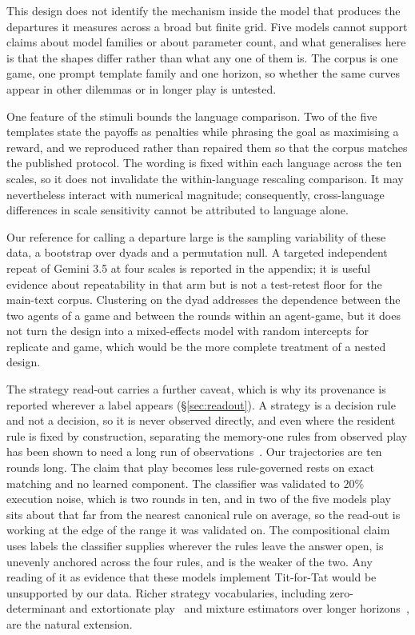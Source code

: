 \documentclass[openacc]{rsproca_new}
\begin{document}
This design does not identify the mechanism inside the model that produces the
departures it measures across a broad but finite grid. Five models cannot
support claims about model families or about parameter count, and what
generalises here is that the shapes differ rather than what any one of them is.
The corpus is one game, one prompt template family and one horizon, so whether
the same curves appear in other dilemmas or in longer play is untested.

One feature of the stimuli bounds the language comparison. Two of the five
templates state the payoffs as penalties while phrasing the goal as maximising
a reward, and we reproduced rather than repaired them so that the corpus
matches the published protocol. The wording is fixed within each language
across the ten scales, so it does not invalidate the within-language rescaling
comparison. It may nevertheless interact with numerical magnitude; consequently,
cross-language differences in scale sensitivity cannot be attributed to language
alone.

Our reference for calling a departure large is the sampling variability of
these data, a bootstrap over dyads and a permutation null. A targeted
independent repeat of Gemini 3.5 at four scales is reported in the appendix;
it is useful evidence about repeatability in that arm but is not a test-retest
floor for the main-text corpus.
Clustering on the dyad addresses the dependence between the two agents of a
game and between the rounds within an agent-game, but it does not turn the
design into a mixed-effects model with random intercepts for replicate and
game, which would be the more complete treatment of a nested design.

The strategy read-out carries a further caveat, which is why its provenance is
reported wherever a label appears (\S\ref{sec:readout}). A strategy is a
decision rule and not a decision, so it is never observed directly, and even
where the resident rule is fixed by construction, separating the memory-one
rules from observed play has been shown to need a long run of
observations~\cite{kim2021win}. Our trajectories are ten rounds long. The claim
that play becomes less rule-governed rests on exact matching and no learned
component. The classifier was validated to $20\%$ execution noise, which is two
rounds in ten, and in two of the five models play sits about that far from the
nearest canonical rule on average, so the read-out is working at the edge of
the range it was validated on. The compositional claim uses labels the
classifier supplies wherever the rules leave the answer open, is unevenly
anchored across the four rules, and is the weaker of the two. Any reading of it
as evidence that these models implement Tit-for-Tat would be unsupported by our
data. Richer strategy vocabularies, including zero-determinant and extortionate
play~\cite{pressDyson2012,hilbe2013memory} and mixture estimators over longer
horizons~\cite{fontana2025nicer,inferenceStrategies}, are the natural extension.
\end{document}
